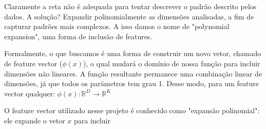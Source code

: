 \documentclass{article}
\begin{document}
Claramente a reta não é adequada para tentar descrever o 
padrão descrito pelos dados. A solução? Expandir polinomialmente
as dimensões analisadas, a fim de capturar padrões mais 
complexos. A isso damos o nome de "polynomial expansion", uma
forma de inclusão de features.

Formalmente, o que buscamos é uma forma de construir um novo
vetor, chamado de feature vector ($\phi(x)$), o qual mudará
o domínio de nossa função para incluir dimensões não lineares.
A função resultante permanece uma combinação linear de dimensões,
já que todos os parâmetros tem grau 1. Desse modo, para
um feature vector qualquer: $\phi(x): \mathbb{R}^{D} \rightarrow
\mathbb{R}^{K}$

O feature vector utilizado nesse projeto é conhecido como
"expansão polinomial": ele expande o vetor $x$ para incluir
\end{document}
